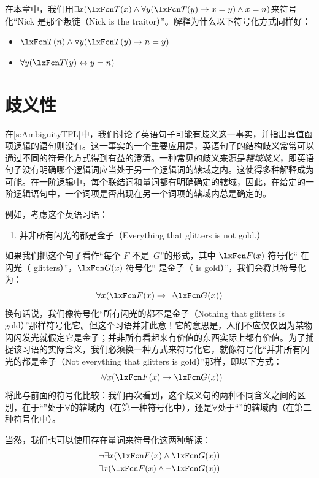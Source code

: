 \problempart
在本章中，我们用$\exists x (\atom{T}{x} \eand \forall y(\atom{T}{y} \eif x = y) \eand x = n)$来符号化“Nick 是那个叛徒（Nick is the traitor）”。解释为什么以下符号化方式同样好：
	\begin{itemize}
		\item $\atom{T}{n} \eand \forall y(\atom{T}{y} \eif n = y)$
		\item $\forall y(\atom{T}{y} \eiff y = n)$
	\end{itemize}

\chapter{歧义性}\label{s:ambiguityFOL}

在\cref{s:AmbiguityTFL}中，我们讨论了英语句子可能有歧义这一事实，并指出真值函项逻辑的语句则没有。这一事实的一个重要应用是，英语句子的结构歧义常常可以通过不同的符号化方式得到有益的澄清。一种常见的歧义来源是\emph{辖域歧义}，即英语句子没有明确哪个逻辑词应当处于另一个逻辑词的辖域之内。这使得多种解释成为可能。在一阶逻辑中，每个联结词和量词都有明确确定的辖域，因此，在给定的一阶逻辑语句中，一个词项是否出现在另一个词项的辖域内总是确定的。

例如，考虑这个英语习语：
\begin{enumerate}
	\item\label{glitters}
	并非所有闪光的都是金子（Everything that glitters is not gold.）
\end{enumerate}
如果我们把这个句子看作“每个 $F$ 不是~$G$”的形式，其中 $\atom{F}{x}$ 符号化“ 在闪光（ glitters）”，$\atom{G}{x}$ 符号化“ 是金子（ is gold）”，我们会将其符号化为：
\[\forall x(\atom{F}{x} \eif \enot \atom{G}{x})\]
换句话说，我们像符号化“所有闪光的都不是金子（Nothing that glitters is gold）”那样符号化它。但这个习语并非此意！它的意思是，人们不应仅仅因为某物闪闪发光就假定它是金子；并非所有看起来有价值的东西实际上都有价值。为了捕捉该习语的实际含义，我们必须换一种方式来符号化它，就像符号化“并非所有闪光的都是金子（Not everything that glitters is gold）”那样，即以下方式：
\[\enot\forall x(\atom{F}{x} \eif \atom{G}{x})\]
将此与前面的符号化比较：我们再次看到，这个歧义句的两种不同含义之间的区别，在于“\enot”处于$\forall$的辖域内（在第一种符号化中），还是$\forall$处于“\enot”的辖域内（在第二种符号化中）。

当然，我们也可以使用存在量词来符号化这两种解读：
\begin{align*}
	& \enot\exists x(\atom{F}{x} \eand \atom{G}{x}) \\
	& \exists x(\atom{F}{x} \eand \enot \atom{G}{x})
\end{align*}

